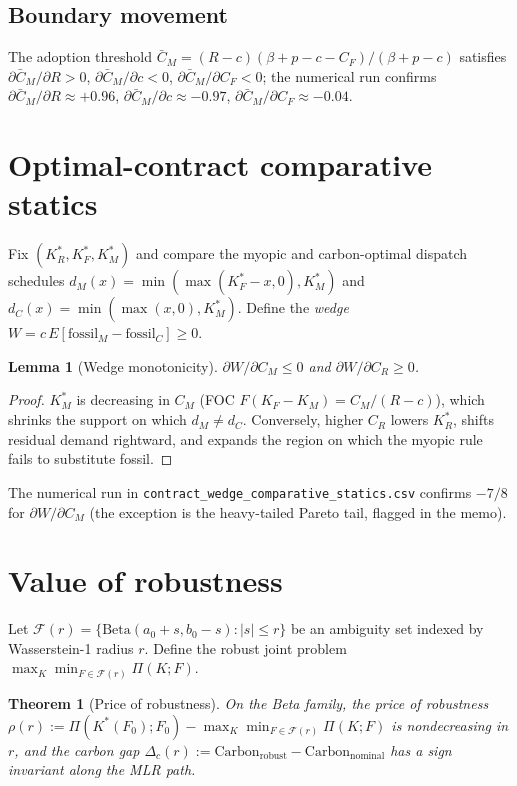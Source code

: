 \documentclass[11pt]{article}
\newtheorem{theorem}{Theorem}
\newtheorem{lemma}{Lemma}
\begin{document}
\subsection*{Boundary movement}
The adoption threshold $\bar C_M = (R-c)(\beta+p-c-C_F)/(\beta+p-c)$ satisfies
$\partial \bar C_M/\partial R > 0$, $\partial \bar C_M/\partial c < 0$,
$\partial \bar C_M/\partial C_F < 0$; the numerical run confirms
$\partial \bar C_M/\partial R \approx +0.96$,
$\partial \bar C_M/\partial c \approx -0.97$,
$\partial \bar C_M/\partial C_F \approx -0.04$.

\section{Optimal-contract comparative statics}
Fix $(K_R^\ast, K_F^\ast, K_M^\ast)$ and compare the myopic and
carbon-optimal dispatch schedules
$d_M(x) = \min(\max(K_F^\ast - x,0), K_M^\ast)$ and
$d_C(x) = \min(\max(x,0), K_M^\ast)$. Define the \emph{wedge}
$W = c\,E[\text{fossil}_M - \text{fossil}_C] \ge 0$.

\begin{lemma}[Wedge monotonicity]\label{lem:wedge}
$\partial W/\partial C_M \le 0$ and $\partial W/\partial C_R \ge 0$.
\end{lemma}

\begin{proof}
$K_M^\ast$ is decreasing in $C_M$ (FOC $F(K_F-K_M) = C_M/(R-c)$),
which shrinks the support on which $d_M \ne d_C$. Conversely, higher $C_R$
lowers $K_R^\ast$, shifts residual demand rightward, and expands the
region on which the myopic rule fails to substitute fossil.
\end{proof}

The numerical run in
\texttt{contract\_wedge\_comparative\_statics.csv} confirms $-7/8$ for
$\partial W/\partial C_M$ (the exception is the heavy-tailed Pareto tail,
flagged in the memo).

\section{Value of robustness}
Let $\mathcal F(r) = \{\mathrm{Beta}(a_0+s, b_0-s) : |s| \le r\}$ be an
ambiguity set indexed by Wasserstein-1 radius $r$. Define the robust joint
problem $\max_{K}\min_{F \in \mathcal F(r)} \Pi(K;F)$.

\begin{theorem}[Price of robustness]\label{thm:robust}
On the Beta family, the price of robustness $\rho(r) :=
\Pi(K^\ast(F_0); F_0) - \max_K \min_{F \in \mathcal F(r)} \Pi(K;F)$
is nondecreasing in $r$, and the carbon gap
$\Delta_c(r) := \mathrm{Carbon}_{\text{robust}} - \mathrm{Carbon}_{\text{nominal}}$
has a sign invariant along the MLR path.
\end{theorem}
\end{document}
